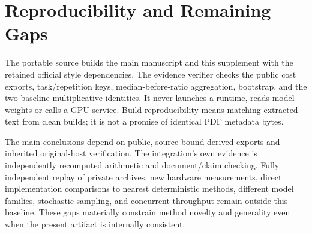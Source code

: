\documentclass{article}
\begin{document}
\section{Reproducibility and Remaining Gaps}
The portable source builds the main manuscript and this supplement with the retained official style dependencies. The evidence verifier checks the public cost exports, task/repetition keys, median-before-ratio aggregation, bootstrap, and the two-baseline multiplicative identities. It never launches a runtime, reads model weights or calls a GPU service. Build reproducibility means matching extracted text from clean builds; it is not a promise of identical PDF metadata bytes.

The main conclusions depend on public, source-bound derived exports and inherited original-host verification. The integration's own evidence is independently recomputed arithmetic and document/claim checking. Fully independent replay of private archives, new hardware measurements, direct implementation comparisons to nearest deterministic methods, different model families, stochastic sampling, and concurrent throughput remain outside this baseline. These gaps materially constrain method novelty and generality even when the present artifact is internally consistent.
\end{document}
